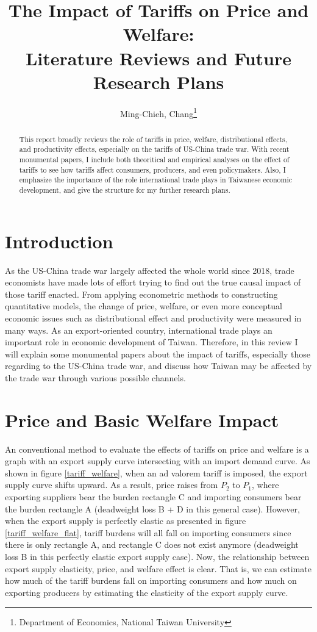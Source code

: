 \documentclass[12pt]{article}
\title{The Impact of Tariffs on Price and Welfare: \\ Literature Reviews and Future Research Plans}
\author{Ming-Chieh, Chang\thanks{Department of Economics, National Taiwan University}}
\begin{document}
\maketitle

\begin{abstract}
This report broadly reviews the role of tariffs in price, welfare, distributional effects, and productivity effects, especially on the tariffs of US-China trade war.
With recent monumental papers, I include both theoritical and empirical analyses on the effect of tariffs to see how tariffs affect consumers, producers, and even policymakers.
Also, I emphasize the importance of the role international trade plays in Taiwanese economic development, and give the structure for my further research plans.
\end{abstract}

\section{Introduction}
\label{sec:intro}
As the US-China trade war largely affected the whole world since 2018, 
trade economists have made lots of effort trying to find out the true causal impact of those tariff enacted. 
From applying econometric methods to constructing quantitative models, 
the change of price, welfare, or even more conceptual economic issues such as distributional effect and productivity were measured in many ways.
As an export-oriented country, international trade plays an important role in economic development of Taiwan.
Therefore, in this review I will explain some monumental papers about the impact of tariffs, 
especially those regarding to the US-China trade war, and discuss how Taiwan may be affected by the trade war through various possible channels.

\section{Price and Basic Welfare Impact}
\label{sec:price, welfare}
An conventional method to evaluate the effects of tariffs on price and welfare is a graph with an export supply curve intersecting with an import demand curve. \cite{amiti2019impact}
As shown in figure \ref{tariff_welfare}, when an ad valorem tariff is imposed, the export supply curve shifts upward. 
As a result, price raises from $P_2$ to $P_1$, where exporting suppliers bear the burden rectangle C and importing consumers bear the burden rectangle A 
(deadweight loss B + D in this general case).
However, when the export supply is perfectly elastic as presented in figure \ref{tariff_welfare_flat}, 
tariff burdens will all fall on importing consumers since there is only rectangle A, and rectangle C does not exist anymore 
(deadweight loss B in this perfectly elastic export supply case).
Now, the relationship between export supply elasticity, price, and welfare effect is clear. 
That is, we can estimate how much of the tariff burdens fall on importing consumers and how much on exporting producers by estimating the elasticity of the export supply curve.
\end{document}

